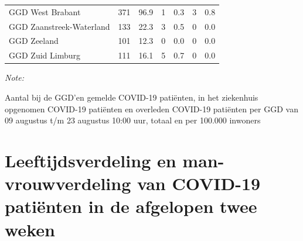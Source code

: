 \documentclass[
  english,
  man,floatsintext]{apa6}
\begin{document}
\begin{table}[H]
\begin{threeparttable}
\begin{tabular}{lrrrrrr}
GGD West Brabant & 371 & 96.9 & 1 & 0.3 & 3 & 0.8\\
GGD Zaanstreek-Waterland & 133 & 22.3 & 3 & 0.5 & 0 & 0.0\\
GGD Zeeland & 101 & 12.3 & 0 & 0.0 & 0 & 0.0\\
GGD Zuid Limburg & 111 & 16.1 & 5 & 0.7 & 0 & 0.0\\
\bottomrule
\end{tabular}
\begin{tablenotes}
\item \textit{Note: } 
\item Aantal bij de GGD’en gemelde COVID-19 patiënten, in het ziekenhuis opgenomen COVID-19 patiënten en overleden COVID-19 patiënten per GGD van 09 augustus t/m 23 augustus 10:00 uur, totaal en per 100.000 inwoners
\end{tablenotes}
\end{threeparttable}
\endgroup{}
\end{table}

\newpage

\hypertarget{leeftijdsverdeling-en-man-vrouwverdeling-van-covid-19-patiuxebnten-in-de-afgelopen-twee-weken}{%
\section{Leeftijdsverdeling en man-vrouwverdeling van COVID-19 patiënten in de afgelopen twee weken}\label{leeftijdsverdeling-en-man-vrouwverdeling-van-covid-19-patiuxebnten-in-de-afgelopen-twee-weken}}
\end{document}
